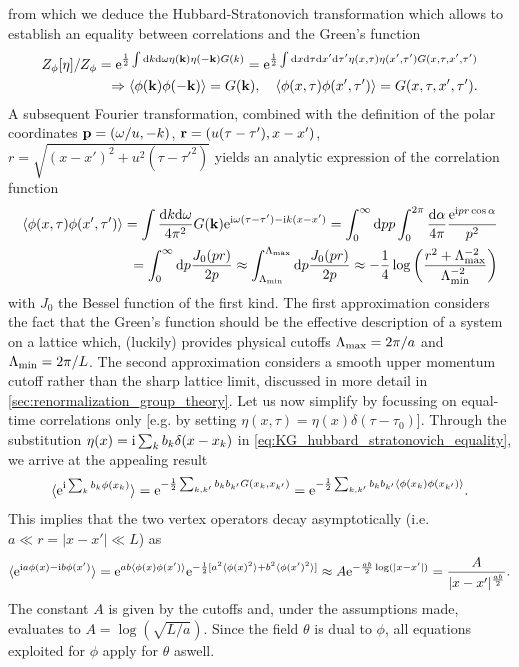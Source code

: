 from which we deduce the Hubbard-Stratonovich transformation which allows to establish an equality between correlations and the Green's function
\begin{align}
    Z_\phi[\eta]/Z_\phi = \mathrm e^{\frac12\int\mathrm d k\mathrm d\omega \eta({\bf k})\eta(-{\bf k})G(k)}
    = \mathrm e^{\frac12\int\mathrm d x\mathrm d\tau\mathrm d x'\mathrm d\tau' \eta(x,\tau)\eta(x',\tau')G(x,\tau,x',\tau')}
    \label{eq:KG_hubbard_stratonovich_equality}\\
    \Rightarrow \braket{\phi({\bf k})\phi(-{\bf k})} = G({\bf k}),
    \quad
    \braket{\phi(x,\tau)\phi(x',\tau')} = G(x,\tau,x',\tau').
    \label{eq:KG_greens_functions_equality}
\end{align}
A subsequent Fourier transformation, combined with the definition of the polar coordinates ${\bf p}=(\omega/u,-k)$, ${\bf r} = (u(\tau-\tau'), x-x')$, $r = \sqrt{(x-x')^2+u^2(\tau-\tau'^2)}$ yields an analytic expression of the correlation function
\begin{align}
    \braket{\phi(x,\tau)\phi(x',\tau')}
    = \int\frac{\mathrm d k\mathrm d\omega}{4\pi^2}G({\bf k})\mathrm e^{\mathrm i\omega(\tau-\tau')-\mathrm i k(x-x')}
    = \int_0^\infty\mathrm d pp\int_0^{2\pi}\frac{\mathrm d\alpha}{4\pi}\frac{\mathrm e^{\mathrm i pr\cos\alpha}}{p^2}
    \\
    = \int_0^\infty\mathrm d p\frac{J_0(pr)}{2p}
    \approx
    \int_{\Lambda_{\rm min}}^{\Lambda_{\rm max}}\mathrm d p \frac{J_0(pr)}{2p}
    \approx
    -\frac14\log\left( \frac{r^2+\Lambda_{\rm max}^{-2}}{\Lambda_{\rm min}^{-2}} \right)
    \label{eq:kg_correlations_approximation}
\end{align}
with $J_0$ the Bessel function of the first kind.
The first approximation considers the fact that the Green's function should be the effective description of a system on a lattice which, (luckily) provides physical cutoffs $\Lambda_{\rm max} = 2\pi/a$ and $\Lambda_{\rm min} = 2\pi/L$.
The second approximation considers a smooth upper momentum cutoff rather than the sharp lattice limit, discussed in more detail in \cref{sec:renormalization_group_theory}.
Let us now simplify by focussing on equal-time correlations only [e.g. by setting $\eta(x,\tau)=\eta(x)\delta(\tau-\tau_0)$].
Through the substitution $\eta(x) = \mathrm i\sum_{k}b_k\delta(x-x_k)$ in \cref{eq:KG_hubbard_stratonovich_equality}, we arrive at the appealing result
\begin{align}
    \braket{\mathrm e^{\mathrm i\sum_kb_k\phi(x_k)}} = \mathrm e^{-\frac12\sum_{k,k'}b_kb_{k'}G(x_k,x_{k'})} = \mathrm e^{-\frac12\sum_{k,k'}b_kb_{k'}\braket{\phi(x_k)\phi(x_{k'})}}.
    \label{eq:expectation_value_exponential_fields}
\end{align}
This implies that the two vertex operators decay asymptotically (i.e. $a\ll r=|x-x'|\ll L$) as
\begin{align}
    \braket{\mathrm e^{\mathrm i a\phi(x) - \mathrm i b\phi(x')}}
    = \mathrm e^{ab\braket{\phi(x)\phi(x')}}\mathrm e^{-\frac12[a^2\braket{\phi(x)^2}+b^2\braket{\phi(x')^2}]}
    \approx A\mathrm e^{-\frac{ab}2\log(|x-x'|)}
    = \frac A{|x-x'|^{\frac{ab}2}}.
\end{align}
The constant $A$ is given by the cutoffs and, under the assumptions made, evaluates to $A = \log(\sqrt{L/a})$.
Since the field $\theta$ is dual to $\phi$, all equations exploited for $\phi$ apply for $\theta$ aswell.
\\

